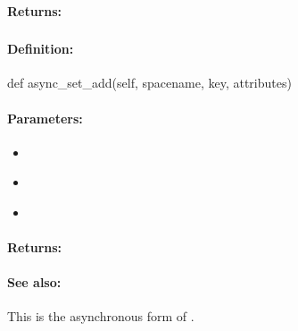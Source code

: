 \paragraph{Returns:}


\pagebreak
\subsubsection{}
\label{api:python:async_set_add}


\paragraph{Definition:}
\begin{pythoncode}
def async_set_add(self, spacename, key, attributes)
\end{pythoncode}

\paragraph{Parameters:}
\begin{itemize}[noitemsep]
\item {}\\

\item {}\\

\item {}\\

\end{itemize}

\paragraph{Returns:}


\paragraph{See also:}  This is the asynchronous form of .

\pagebreak
\subsubsection{}
\label{api:python:cond_set_add}


